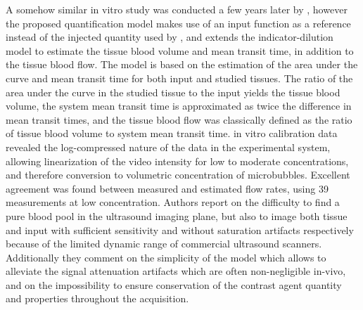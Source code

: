 A somehow similar in vitro study was conducted a few years later by \citet{Heidenreich:1993ji}, however the proposed quantification model makes use of an input function as a reference instead of the injected quantity used by \citet{Bleeker:1990uy}, and extends the indicator-dilution model to estimate the tissue blood volume and mean transit time, in addition to the tissue blood flow. 
The model is based on the estimation of the area under the curve and mean transit time for both input and studied tissues.
The ratio of the area under the curve in the studied tissue to the input yields the tissue blood volume, the system mean transit time is approximated as twice the difference in mean transit times, and the tissue blood flow was classically defined as the ratio of tissue blood volume to system mean transit time.
in vitro calibration data revealed the log-compressed nature of the data in the experimental system, allowing linearization of the video intensity for low to moderate concentrations, and therefore conversion to volumetric concentration of microbubbles.
Excellent agreement was found between measured and estimated flow rates, using 39 measurements at low concentration.
Authors report on the difficulty to find a pure blood pool in the ultrasound imaging plane, but also to image both tissue and input with sufficient sensitivity and without saturation artifacts respectively because of the limited dynamic range of commercial ultrasound scanners.
Additionally they comment on the simplicity of the model which allows to alleviate the signal attenuation artifacts which are often non-negligible in-vivo, and on the impossibility to ensure conservation of the contrast agent quantity and properties throughout the acquisition. 

